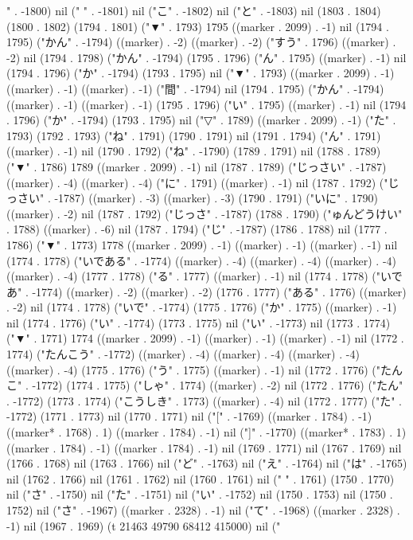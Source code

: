 " . -1800) nil (" " . -1801) nil ("こ" . -1802) nil ("と" . -1803) nil (1803 . 1804) (1800 . 1802) (1794 . 1801) ("▼" . 1793) 1795 ((marker . 2099) . -1) nil (1794 . 1795) ("かん" . -1794) ((marker) . -2) ((marker) . -2) ("すう" . 1796) ((marker) . -2) nil (1794 . 1798) ("かん" . -1794) (1795 . 1796) ("ん" . 1795) ((marker) . -1) nil (1794 . 1796) ("か" . -1794) (1793 . 1795) nil ("▼" . 1793) ((marker . 2099) . -1) ((marker) . -1) ((marker) . -1) ("間" . -1794) nil (1794 . 1795) ("かん" . -1794) ((marker) . -1) ((marker) . -1) (1795 . 1796) ("い" . 1795) ((marker) . -1) nil (1794 . 1796) ("か" . -1794) (1793 . 1795) nil ("▽" . 1789) ((marker . 2099) . -1) ("た" . 1793) (1792 . 1793) ("ね" . 1791) (1790 . 1791) nil (1791 . 1794) ("ん" . 1791) ((marker) . -1) nil (1790 . 1792) ("ね" . -1790) (1789 . 1791) nil (1788 . 1789) ("▼" . 1786) 1789 ((marker . 2099) . -1) nil (1787 . 1789) ("じっさい" . -1787) ((marker) . -4) ((marker) . -4) ("に" . 1791) ((marker) . -1) nil (1787 . 1792) ("じっさい" . -1787) ((marker) . -3) ((marker) . -3) (1790 . 1791) ("いに" . 1790) ((marker) . -2) nil (1787 . 1792) ("じっさ" . -1787) (1788 . 1790) ("ゅんどうけい" . 1788) ((marker) . -6) nil (1787 . 1794) ("じ" . -1787) (1786 . 1788) nil (1777 . 1786) ("▼" . 1773) 1778 ((marker . 2099) . -1) ((marker) . -1) ((marker) . -1) nil (1774 . 1778) ("いである" . -1774) ((marker) . -4) ((marker) . -4) ((marker) . -4) ((marker) . -4) (1777 . 1778) ("る" . 1777) ((marker) . -1) nil (1774 . 1778) ("いであ" . -1774) ((marker) . -2) ((marker) . -2) (1776 . 1777) ("ある" . 1776) ((marker) . -2) nil (1774 . 1778) ("いで" . -1774) (1775 . 1776) ("か" . 1775) ((marker) . -1) nil (1774 . 1776) ("い" . -1774) (1773 . 1775) nil ("い" . -1773) nil (1773 . 1774) ("▼" . 1771) 1774 ((marker . 2099) . -1) ((marker) . -1) ((marker) . -1) nil (1772 . 1774) ("たんこう" . -1772) ((marker) . -4) ((marker) . -4) ((marker) . -4) ((marker) . -4) (1775 . 1776) ("う" . 1775) ((marker) . -1) nil (1772 . 1776) ("たんこ" . -1772) (1774 . 1775) ("しゃ" . 1774) ((marker) . -2) nil (1772 . 1776) ("たん" . -1772) (1773 . 1774) ("こうしき" . 1773) ((marker) . -4) nil (1772 . 1777) ("た" . -1772) (1771 . 1773) nil (1770 . 1771) nil ("[" . -1769) ((marker . 1784) . -1) ((marker* . 1768) . 1) ((marker . 1784) . -1) nil ("]" . -1770) ((marker* . 1783) . 1) ((marker . 1784) . -1) ((marker . 1784) . -1) nil (1769 . 1771) nil (1767 . 1769) nil (1766 . 1768) nil (1763 . 1766) nil ("ど" . -1763) nil ("え" . -1764) nil ("は" . -1765) nil (1762 . 1766) nil (1761 . 1762) nil (1760 . 1761) nil (" " . 1761) (1750 . 1770) nil ("さ" . -1750) nil ("た" . -1751) nil ("い" . -1752) nil (1750 . 1753) nil (1750 . 1752) nil ("さ" . -1967) ((marker . 2328) . -1) nil ("て" . -1968) ((marker . 2328) . -1) nil (1967 . 1969) (t 21463 49790 68412 415000) nil ("

